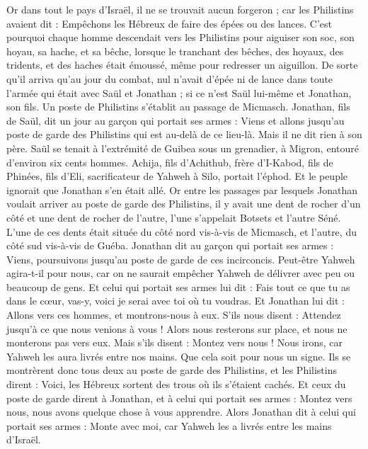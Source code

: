 \begin{multicols}{2}
Or dans tout le pays d'Israël, il ne se trouvait aucun forgeron ; car les Philistins avaient dit : Empêchons les Hébreux de faire des épées ou des lances.
C'est pourquoi chaque homme descendait vers les Philistins pour aiguiser son soc, son hoyau, sa hache, et sa bêche,
lorsque le tranchant des bêches, des hoyaux, des tridents, et des haches était émoussé, même pour redresser un aiguillon.
De sorte qu'il arriva qu'au jour du combat, nul n'avait d'épée ni de lance dans toute l'armée qui était avec Saül et Jonathan ; si ce n'est Saül lui-même et Jonathan, son fils.
Un poste de Philistins s'établit au passage de Micmasch.
\VerseOne{}Jonathan, fils de Saül, dit un jour au garçon qui portait ses armes : Viens et allons jusqu'au poste de garde des Philistins qui est au-delà de ce lieu-là. Mais il ne dit rien à son père.
Saül se tenait à l'extrémité de Guibea sous un grenadier, à Migron, entouré d'environ six cents hommes.
Achija, fils d'Achithub, frère d'I-Kabod, fils de Phinées, fils d'Eli, sacrificateur de Yahweh à Silo, portait l'éphod. Et le peuple ignorait que Jonathan s'en était allé.
Or entre les passages par lesquels Jonathan voulait arriver au poste de garde des Philistins, il y avait une dent de rocher d'un côté et une dent de rocher de l'autre, l'une s'appelait Botsets et l'autre Séné.
L'une de ces dents était située du côté nord vis-à-vis de Micmasch, et l'autre, du côté sud vis-à-vis de Guéba.
Jonathan dit au garçon qui portait ses armes : Viens, poursuivons jusqu'au poste de garde de ces incirconcis. Peut-être Yahweh agira-t-il pour nous, car on ne saurait empêcher Yahweh de délivrer avec peu ou beaucoup de gens.
Et celui qui portait ses armes lui dit : Fais tout ce que tu as dans le cœur, vas-y, voici je serai avec toi où tu voudras.
Et Jonathan lui dit : Allons vers ces hommes, et montrons-nous à eux.
S'ils nous disent : Attendez jusqu'à ce que nous venions à vous ! Alors nous resterons sur place, et nous ne monterons pas vers eux.
Mais s'ils disent : Montez vers nous ! Nous irons, car Yahweh les aura livrés entre nos mains. Que cela soit pour nous un signe.
Ils se montrèrent donc tous deux au poste de garde des Philistins, et les Philistins dirent : Voici, les Hébreux sortent des trous où ils s'étaient cachés.
Et ceux du poste de garde dirent à Jonathan, et à celui qui portait ses armes : Montez vers nous, nous avons quelque chose à vous apprendre. Alors Jonathan dit à celui qui portait ses armes : Monte avec moi, car Yahweh les a livrés entre les mains d'Israël.

\end{multicols}
